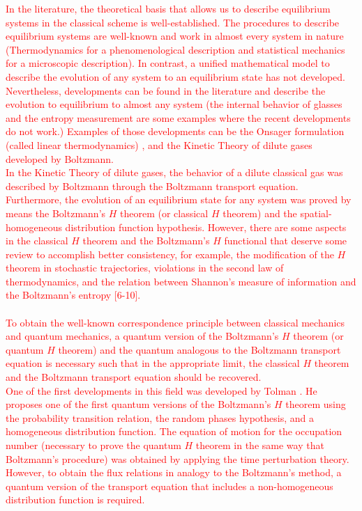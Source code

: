 \documentclass{article}
\begin{document}
\textcolor{red}{In the literature, the theoretical basis that allows us to describe equilibrium systems in the classical scheme is well-established. The procedures to describe equilibrium systems are well-known and work in almost every system in nature (Thermodynamics for a phenomenological description and statistical mechanics for a microscopic description). In contrast, a unified mathematical model to describe the evolution of any system to an equilibrium state has not developed. Nevertheless, developments can be found in the literature and describe the evolution to equilibrium to almost any system (the internal behavior of glasses \cite{cristal1} and the entropy measurement \cite{cristal2, cristal3} are some examples where the recent developments do not work.) Examples of those developments can be the Onsager formulation (called linear thermodynamics) \cite{kei, onsager}, and the Kinetic Theory of dilute gases developed by Boltzmann.\\
In the Kinetic Theory of dilute gases, the behavior of a dilute classical gas was described by Boltzmann through the Boltzmann transport equation. Furthermore, the evolution of an equilibrium state for any system was proved by means the Boltzmann's $H$ theorem (or classical $H$ theorem) and the spatial-homogeneous distribution function hypothesis.
However, there are some aspects in the classical $H$ theorem and the Boltzmann's $H$ functional that deserve some review to accomplish better consistency, for example, the modification of the $H$ theorem in stochastic trajectories, violations in the second law of thermodynamics, and the relation between Shannon's measure of information and the Boltzmann's entropy  [6-10].\\ 
\\
To obtain the well-known correspondence principle between classical mechanics and quantum mechanics, a quantum version of the Boltzmann's $H$ theorem (or quantum $H$ theorem) and the quantum analogous to the Boltzmann transport equation is necessary such that in the appropriate limit, the  classical $H$ theorem and the Boltzmann transport equation should be recovered.\\
One of the first developments in this field was developed by Tolman \cite{tolman}. He proposes one of the first quantum versions of the Boltzmann's $H$ theorem using the probability transition relation, the random phases hypothesis, and a homogeneous distribution function. The equation of motion for the occupation number (necessary to prove the quantum $H$ theorem in the same way that Boltzmann's procedure) was obtained by applying the time perturbation theory. However, to obtain the flux relations in analogy to the Boltzmann's method, a quantum version of the transport equation that includes a non-homogeneous distribution function is required.\\
}
\end{document}
